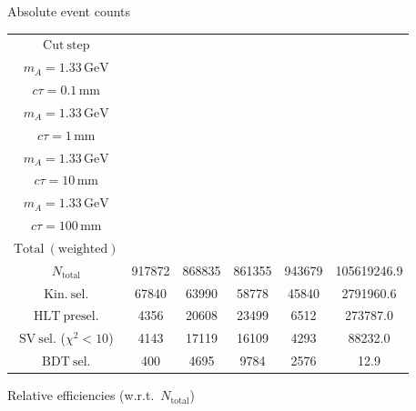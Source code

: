 \documentclass[10pt,a4paper]{article}
\renewcommand{\arraystretch}{1.4}
\begin{document}
{\footnotesize\setlength{\tabcolsep}{4pt}\renewcommand{\arraystretch}{1.05}%
\vspace{12pt}

Absolute event counts

\begin{tabular}{cccccc}
\toprule
$\mathrm{Cut\ step}$ & \shortstack{$m_{\pi}=4\,\mathrm{GeV}$\\$m_{A}=1.33\,\mathrm{GeV}$\\$c\tau=0.1\,\mathrm{mm}$} & \shortstack{$m_{\pi}=4\,\mathrm{GeV}$\\$m_{A}=1.33\,\mathrm{GeV}$\\$c\tau=1\,\mathrm{mm}$} & \shortstack{$m_{\pi}=4\,\mathrm{GeV}$\\$m_{A}=1.33\,\mathrm{GeV}$\\$c\tau=10\,\mathrm{mm}$} & \shortstack{$m_{\pi}=4\,\mathrm{GeV}$\\$m_{A}=1.33\,\mathrm{GeV}$\\$c\tau=100\,\mathrm{mm}$} & \shortstack{$\mathrm{QCD}$\\$\mathrm{Total\ (weighted)}$} \\
\midrule
$N_{\mathrm{total}}$ & 917872 & 868835 & 861355 & 943679 & 105619246.9\\
$\mathrm{Kin.\ sel.}$ & 67840 & 63990 & 58778 & 45840 & 2791960.6\\
$\mathrm{HLT\ presel.}$ & 4356 & 20608 & 23499 & 6512 & 273787.0\\
$\mathrm{SV\ sel.}$ ($\chi^2{<}10$) & 4143 & 17119 & 16109 & 4293 & 88232.0\\
$\mathrm{BDT\ sel.}$ & 400 & 4695 & 9784 & 2576 & 12.9\\
\bottomrule
\end{tabular}

\vspace{18pt}

Relative efficiencies (w.r.t.\ $N_{\mathrm{total}}$)

}
\end{document}
